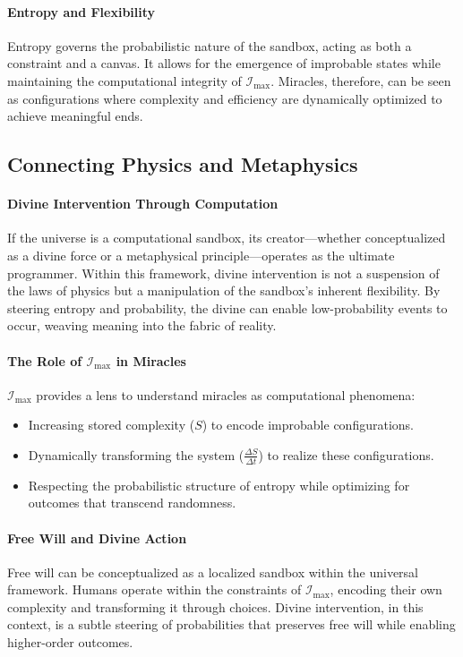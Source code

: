 \documentclass[12pt]{article}
\begin{document}
\paragraph{Entropy and Flexibility}
Entropy governs the probabilistic nature of the sandbox, acting as both a constraint and a canvas. It allows for the emergence of improbable states while maintaining the computational integrity of \(\mathcal{I}_{\text{max}}\). Miracles, therefore, can be seen as configurations where complexity and efficiency are dynamically optimized to achieve meaningful ends.

\subsection{Connecting Physics and Metaphysics}

\paragraph{Divine Intervention Through Computation}
If the universe is a computational sandbox, its creator—whether conceptualized as a divine force or a metaphysical principle—operates as the ultimate programmer. Within this framework, divine intervention is not a suspension of the laws of physics but a manipulation of the sandbox's inherent flexibility. By steering entropy and probability, the divine can enable low-probability events to occur, weaving meaning into the fabric of reality.

\paragraph{The Role of \(\mathcal{I}_{\text{max}}\) in Miracles}
\(\mathcal{I}_{\text{max}}\) provides a lens to understand miracles as computational phenomena:
\begin{itemize}
    \item Increasing stored complexity (\(S\)) to encode improbable configurations.
    \item Dynamically transforming the system (\(\frac{\Delta S}{\Delta t}\)) to realize these configurations.
    \item Respecting the probabilistic structure of entropy while optimizing for outcomes that transcend randomness.
\end{itemize}

\paragraph{Free Will and Divine Action}
Free will can be conceptualized as a localized sandbox within the universal framework. Humans operate within the constraints of \(\mathcal{I}_{\text{max}}\), encoding their own complexity and transforming it through choices. Divine intervention, in this context, is a subtle steering of probabilities that preserves free will while enabling higher-order outcomes.
\end{document}
